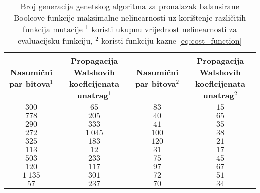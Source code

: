 \begin{table}[]
    \centering
    \begin{tabular}{cccc}
        \makecell{Nasumični \\ par bitova$^1$} & \makecell{Propagacija Walshovih \\ koeficijenata unatrag$^1$} & \makecell{Nasumični \\ par bitova$^2$} & \makecell{Propagacija Walshovih \\ koeficijenata unatrag$^2$} \\ \hline
           $300$ &     $65$ &  $83$ & $15$ \\
           $778$ &    $205$ &  $40$ & $65$ \\
           $290$ &    $333$ &  $41$ & $35$ \\
           $272$ & $1\:045$ & $100$ & $38$ \\
           $325$ &    $183$ & $120$ & $21$ \\
           $113$ &     $12$ &  $31$ & $17$ \\
           $503$ &    $233$ &  $75$ & $45$ \\
           $120$ &    $117$ &  $97$ & $67$ \\
        $1\:135$ &    $301$ &  $72$ & $51$ \\
            $57$ &    $237$ &  $70$ & $34$
    \end{tabular}
    \captionsetup{justification=centering}
    \caption{Broj generacija genetskog algoritma za pronalazak balansirane Booleove funkcije maksimalne nelinearnosti uz korištenje različitih funkcija mutacije \newline
    \footnotesize{$^1$ koristi ukupnu vrijednost nelinearnosti za evaluacijsku funkciju, $^2$ koristi funkciju kazne \eqref{eq:cost_function}} }
    \label{tbl:ga_6_bal}
\end{table}

